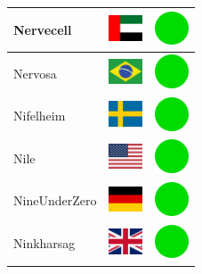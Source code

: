 \documentclass[12pt, a4paper, twoside]{report}
\begin{document}
\begin{center}
\begin{longtable}{|p{5cm}|p{2cm}|p{2cm}|}
 Nervecell                                                  & \includegraphics[width=1cm]{../4x3/ae} &   \includegraphics[width=1cm]{../likes/y} \\ \hline
 Nervosa                                                    & \includegraphics[width=1cm]{../4x3/br} &   \includegraphics[width=1cm]{../likes/y} \\ \hline
 Nifelheim                                                  & \includegraphics[width=1cm]{../4x3/se} &   \includegraphics[width=1cm]{../likes/y} \\ \hline
 Nile                                                       & \includegraphics[width=1cm]{../4x3/us} &   \includegraphics[width=1cm]{../likes/y} \\ \hline
 NineUnderZero                                              & \includegraphics[width=1cm]{../4x3/de} &   \includegraphics[width=1cm]{../likes/y} \\ \hline
 Ninkharsag                                                 & \includegraphics[width=1cm]{../4x3/gb} &   \includegraphics[width=1cm]{../likes/y} \\ \hline

\end{longtable}
\end{center}
\end{document}
